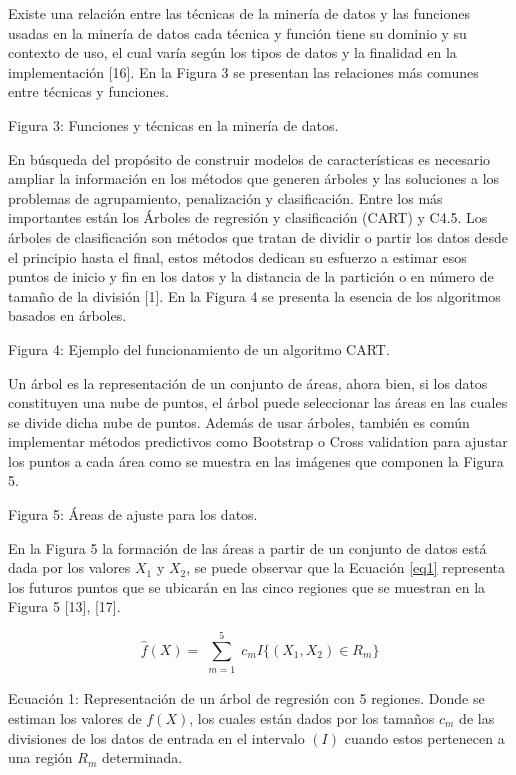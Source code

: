 Existe una relación entre las técnicas de la minería de datos y las funciones usadas en la minería de datos cada técnica y función tiene su dominio y su contexto de uso, el cual varía según los tipos de datos y la finalidad en la implementación [16]. En la Figura 3 se presentan las relaciones más comunes entre técnicas y funciones.


Figura 3: Funciones y técnicas en la minería de datos.


En búsqueda del propósito de construir modelos de características es necesario ampliar la información en los métodos que generen árboles y las soluciones a los problemas de agrupamiento, penalización y clasificación. Entre los más importantes están los Árboles de regresión y clasificación (CART) y C4.5. Los árboles de clasificación son métodos que tratan de dividir o partir los datos desde el principio hasta el final, estos métodos dedican su esfuerzo a estimar esos puntos de inicio y fin en los datos y la distancia de la partición o en número de tamaño de la división [1]. En la Figura 4 se presenta la esencia de los algoritmos basados en árboles.

Figura 4: Ejemplo del funcionamiento de un algoritmo CART.

Un árbol es la representación de un conjunto de áreas, ahora bien, si los datos constituyen una nube de puntos, el árbol puede seleccionar las áreas en las cuales se divide dicha nube de puntos. Además de usar árboles, también es común implementar métodos predictivos como Bootstrap o Cross validation para ajustar los puntos a cada área como se muestra en las imágenes que componen la Figura 5.


Figura 5: Áreas de ajuste para los datos.

En la Figura 5 la formación de las áreas a partir de un conjunto de datos está dada por los valores $X_{1}$ y $X_{2}$, se puede observar que la Ecuación \ref{eq1} representa los futuros puntos que se ubicarán en las cinco regiones que se muestran en la Figura 5 [13], [17]. 

    \begin{equation}
    \hat{f}(X)=\sum_{\substack{m=1}}^5c_{m}I\{(X_{1},X_{2})\in R_{m}\}
    \label{eq1}
    \end{equation}

Ecuación 1: Representación de un árbol de regresión con 5 regiones. Donde se estiman los valores de $f(X)$, los cuales están dados por los tamaños $c_{m}$ de las divisiones de los datos de entrada en el intervalo $(I)$ cuando estos pertenecen a una región $R_{m}$ determinada.


